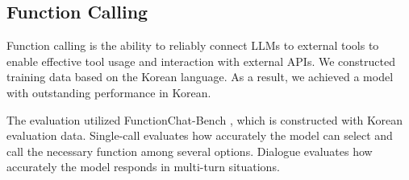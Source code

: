 \subsection{Function Calling}
Function calling is the ability to reliably connect LLMs to external tools to enable effective tool usage and interaction with external APIs. We constructed training data based on the Korean language. As a result, we achieved a model with outstanding performance in Korean.\par

The evaluation utilized FunctionChat-Bench \citep{lee2024functionchat}, which is constructed with Korean evaluation data. Single-call evaluates how accurately the model can select and call the necessary function among several options. Dialogue evaluates how accurately the model responds in multi-turn situations.
\begin{table}[hbt!]
\centering
{}
\caption{Accuracy of FunctionChat-Bench}\label{tab-fc-overall}
\end{table}
